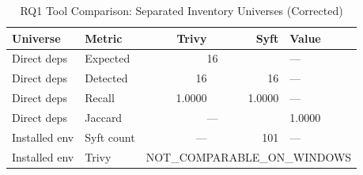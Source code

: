 \begin{table}[htbp]
\caption{RQ1 Tool Comparison: Separated Inventory Universes (Corrected)}
\label{tab:rq1-corrected}
\centering\small
\begin{tabular}{llrrl}
\toprule
\textbf{Universe} & \textbf{Metric} & \textbf{Trivy} & \textbf{Syft} & \textbf{Value} \\
\midrule
  Direct deps & Expected & \multicolumn{2}{c}{16} & --- \\
  Direct deps & Detected & 16 & 16 & --- \\
  Direct deps & Recall & 1.0000 & 1.0000 & --- \\
  Direct deps & Jaccard & \multicolumn{2}{c}{---} & 1.0000 \\
  \midrule
  Installed env & Syft count & --- & 101 & --- \\
  Installed env & Trivy & \multicolumn{3}{l}{NOT\_COMPARABLE\_ON\_WINDOWS} \\
\bottomrule
\end{tabular}
\end{table}
